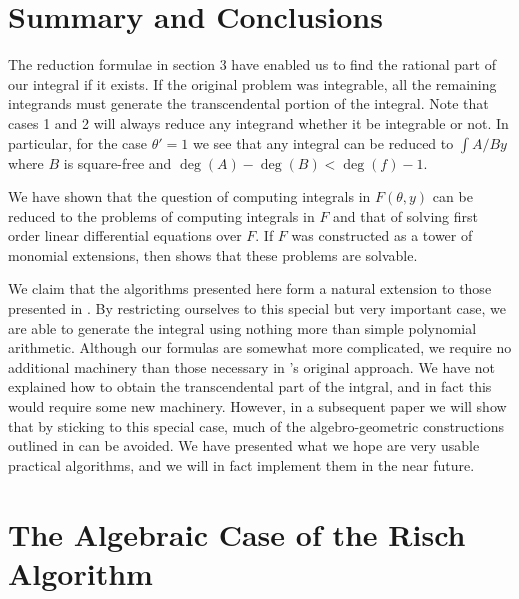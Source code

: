 \section{Summary and Conclusions}

The reduction formulae in section 3 have enabled us to find the rational
part of our integral if it exists.  If the original problem was
integrable, all the remaining integrands must generate the
transcendental portion of the integral.  Note that cases 1 and 2 will
always reduce any integrand whether it be integrable or not.  
In particular, for the case $\theta' = 1$ we see that any
integral can be reduced to $\int A / {B y} $ where $B$ is square-free
and $\deg(A) - \deg(B) < \deg(f) -1$.

We have shown that the question of computing integrals in
$F(\theta,y)$ can be reduced to the problems of computing integrals in
$F$ and that of solving first order linear differential equations over
$F$.  If $F$ was constructed as a tower of monomial extensions, then
\cite{Risch:Integration:Trans} shows that these problems are solvable.

We claim that the algorithms presented here form a natural extension
to those presented in \cite{Risch:Integration:Trans}.  By restricting
ourselves to this special but very important case, we are able to
generate the integral using nothing more than simple polynomial
arithmetic.  Although our formulas are somewhat more complicated, we
require no additional machinery than those necessary in {\Risch}'s
original approach.  We have not explained how to obtain the
transcendental part of the intgral, and in fact this would require
some new machinery.  However, in a subsequent paper we will show that
by sticking to this special case, much of the algebro-geometric
constructions outlined in \cite{Risch:Integration:Solution} can be
avoided. We have presented what we hope are very usable practical
algorithms, and we will in fact implement them in the near future.

\section{The Algebraic Case of the Risch Algorithm}


